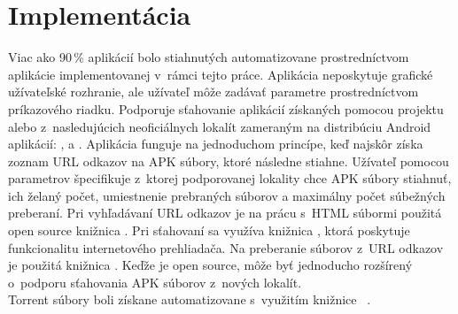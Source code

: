 \section{Implementácia}
Viac ako 90\,\% aplikácií bolo stiahnutých automatizovane prostredníctvom aplikácie  implementovanej v~rámci tejto práce. Aplikácia neposkytuje grafické užívateľské rozhranie, ale užívateľ môže zadávať parametre prostredníctvom príkazového riadku. Podporuje sťahovanie aplikácií získaných pomocou projektu  alebo z~nasledujúcich neoficiálnych lokalít zameraným na distribúciu Android aplikácií: ,  a . Aplikácia funguje na jednoduchom princípe, keď najskôr získa zoznam URL odkazov na APK súbory, ktoré následne stiahne. Užívateľ pomocou parametrov špecifikuje z~ktorej podporovanej lokality chce APK súbory stiahnuť, ich želaný počet, umiestnenie prebraných súborov a maximálny počet súbežných preberaní. Pri vyhľadávaní URL odkazov je na prácu s~HTML súbormi použitá open source knižnica . Pri sťahovaní sa využíva knižnica , ktorá poskytuje funkcionalitu internetového prehliadača. Na preberanie súborov z~URL odkazov je použitá knižnica . Keďže je  open source, môže byť jednoducho rozšírený o~podporu sťahovania APK súborov z~nových lokalít.\\
Torrent súbory boli získane automatizovane s~využitím knižnice ~\cite{flux}.